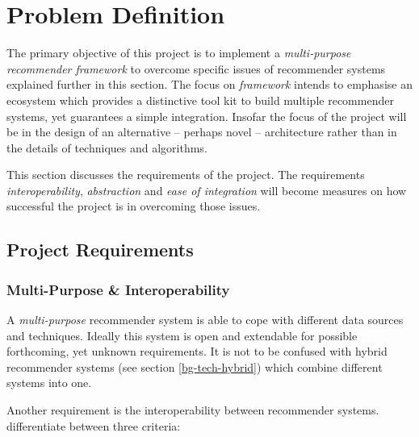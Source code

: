 \chapter{Problem Definition}
\label{problem}

The primary objective of this project is to implement a \textit{multi-purpose recommender framework} to overcome specific issues of recommender systems explained further in this section. The focus on \emph{framework} intends to emphasise an ecosystem which provides a distinctive tool kit to build multiple recommender systems, yet guarantees a simple integration. Insofar the focus of the project will be in the design of an alternative -- perhaps novel -- architecture rather than in the details of techniques and algorithms.

This section discusses the requirements of the project. The requirements \emph{interoperability}, \emph{abstraction} and \emph{ease of integration} will become measures on how successful the project is in overcoming those issues.



\section{Project Requirements}

\subsection{Multi-Purpose \& Interoperability}
\label{problem-multipurpose}

A \emph{multi-purpose} recommender system is able to cope with different data sources and techniques. Ideally this system is open and extendable for possible forthcoming, yet unknown requirements. It is not to be confused with hybrid recommender systems (see section \ref{bg-tech-hybrid}) which combine different systems into one.

Another requirement is the interoperability between recommender systems. \citet{manouselis07} differentiate between three criteria:

